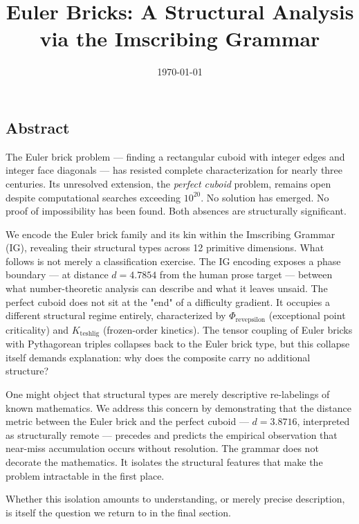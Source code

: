 \documentclass[12pt,a4paper]{article}
\begin{document}
\title{Euler Bricks: A Structural Analysis via the Imscribing Grammar}
\date{\today}

\maketitle

\subsection{Abstract}

The Euler brick problem --- finding a rectangular cuboid with integer edges and integer face diagonals --- has resisted complete characterization for nearly three centuries. Its unresolved extension, the \emph{perfect cuboid} problem, remains open despite computational searches exceeding $10^{20}$. No solution has emerged. No proof of impossibility has been found. Both absences are structurally significant.

We encode the Euler brick family and its kin within the Imscribing Grammar (IG), revealing their structural types across 12 primitive dimensions. What follows is not merely a classification exercise. The IG encoding exposes a phase boundary --- at distance $d = 4.7854$ from the human prose target --- between what number-theoretic analysis can describe and what it leaves unsaid. The perfect cuboid does not sit at the "end" of a difficulty gradient. It occupies a different structural regime entirely, characterized by $\Phi_{\text{revepsilon}}$ (exceptional point criticality) and $K_{\text{teshlig}}$ (frozen-order kinetics). The tensor coupling of Euler bricks with Pythagorean triples collapses back to the Euler brick type, but this collapse itself demands explanation: why does the composite carry no additional structure?

One might object that structural types are merely descriptive re-labelings of known mathematics. We address this concern by demonstrating that the distance metric between the Euler brick and the perfect cuboid --- $d = 3.8716$, interpreted as structurally remote --- precedes and predicts the empirical observation that near-miss accumulation occurs without resolution. The grammar does not decorate the mathematics. It isolates the structural features that make the problem intractable in the first place.

Whether this isolation amounts to understanding, or merely precise description, is itself the question we return to in the final section.
\end{document}
